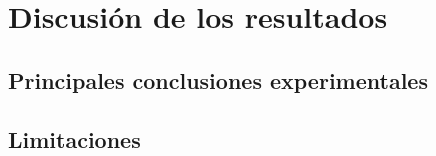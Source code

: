 \section{Discusión de los resultados}
\subsection{Principales conclusiones experimentales}
\subsection{Limitaciones}


